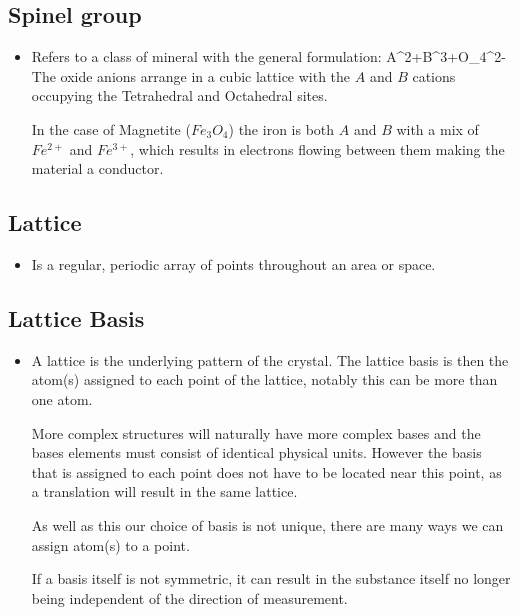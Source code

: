 \documentclass[11pt]{article}
\renewenvironment{flalign}{\empheq[box=\tcbhighmath]{align}}{\endempheq}
\numberwithin{equation}{section}
\begin{document}
\subsection{Spinel group}
\begin{itemize}
    \item Refers to a class of mineral with the general formulation:
\begin{flalign}
A^{2+}B^{3+}O_4^{2-}
\end{flalign}
The oxide anions arrange in a cubic lattice with the $A$ and $B$ cations occupying the Tetrahedral and Octahedral sites. 

In the case of Magnetite ($Fe_3O_4$) the iron is both $A$ and $B$ with a mix of $Fe^{2+}$ and $Fe^{3+}$, which results in electrons flowing between them making the material a conductor. 


\end{itemize}

\subsection{Lattice}
\begin{itemize}
    \item Is a regular, periodic array of points throughout an area or space. 
\end{itemize}

\subsection{Lattice Basis}
\begin{itemize}
    \item A lattice is the underlying pattern of the crystal. The lattice basis is then the atom(s) assigned to each point of the lattice, notably this can be more than one atom. 

More complex structures will naturally have more complex bases and the bases elements must consist of identical physical units. However the basis that is assigned to each point does not have to be located near this point, as a translation will result in the same lattice. 

As well as this our choice of basis is not unique, there are many ways we can assign atom(s) to a point. 

If a basis itself is not symmetric, it can result in the substance itself no longer being independent of the direction of measurement.
\end{itemize}
\end{document}
